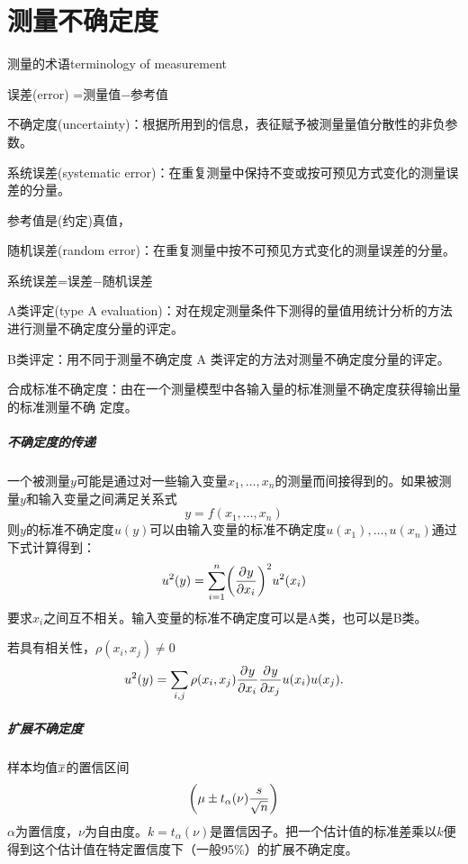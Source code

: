 \chapter{测量不确定度}
\begin{definition}{测量的术语}{terminology of measurement}
	\begin{compactitem}
		\item 误差(error) =测量值$-$参考值
		\item 不确定度(uncertainty)：根据所用到的信息，表征赋予被测量量值分散性的非负参数。
		\item 系统误差(systematic error)：在重复测量中保持不变或按可预见方式变化的测量误差的分量。
		
		参考值是(约定)真值，
		\item 随机误差(random error)：在重复测量中按不可预见方式变化的测量误差的分量。
		
		系统误差=误差$-$随机误差
		\item A类评定(type A evaluation)：对在规定测量条件下测得的量值用统计分析的方法进行测量不确定度分量的评定。
		\item B类评定：用不同于测量不确定度 A 类评定的方法对测量不确定度分量的评定。
		\item 合成标准不确定度：由在一个测量模型中各输入量的标准测量不确定度获得输出量的标准测量不确	定度。
	\end{compactitem}
\end{definition}
\paragraph{不确定度的传递}
一个被测量$ y $可能是通过对一些输入变量$x_1,\ldots,x_n$的测量而间接得到的。如果被测量$ y $和输入变量之间满足关系式
\[
	y=f(x_1,\ldots,x_n)
\]
则$ y $的标准不确定度$ u(y) $可以由输入变量的标准不确定度$u(x_1),\ldots,u(x_n)$通过下式计算得到：
\begin{align}
	u^2(y)=\sum_{i=1}^n\biggl(\frac{\partial^{{}}y}{\partial{x_i}^{{}}}\biggr)^2u^2(x_i)
\end{align}
要求$x_i$之间互不相关。输入变量的标准不确定度可以是A类，也可以是B类。

若具有相关性，$\rho(x_i,x_j)\neq 0$
\begin{align}
	u^2(y)=\sum_{i,j}\rho(x_i,x_j)\frac{\partial^{{}}y}{\partial{x_i}^{{}}}\frac{\partial^{{}}y}{\partial{x_j}^{{}}}u(x_i)u(x_j).
\end{align}
\paragraph{扩展不确定度}
样本均值$\overline{x}$的置信区间
\[
	\biggl(\mu\pm t_{\alpha}(\nu)\frac s{\sqrt n}\biggr)
\]
$\alpha$为置信度，$\nu$为自由度。$k=t_{\alpha}(\nu)$是置信因子。把一个估计值的标准差乘以$ k $便得到这个估计值在特定置信度下（一般95\%）的扩展不确定度。
